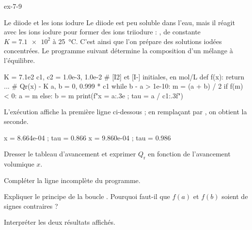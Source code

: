 \begin{blocLivre}{ex-7-9}
\begin{exercice}[2]{Le diiode et les ions iodure}
Le diiode est peu soluble dans l'eau, mais il réagit avec les ions iodure pour former des ions triiodure :
, de constante $K=\num{7.1e2}$ à 25~°C. C'est ainsi que l'on prépare des solutions
iodées concentrées. Le programme suivant détermine la composition d'un mélange à l'équilibre.
\begin{python}
K = 7.1e2
c1, c2 = 1.0e-3, 1.0e-2    # [I2] et [I-] initiales, en mol/L
def f(x):
    return ...             # Qr(x) - K
a, b = 0, 0.999 * c1
while b - a > 1e-10:
    m = (a + b) / 2
    if f(m) < 0:
        a = m
    else:
        b = m
print(f"x = {a:.3e} ; tau = {a / c1:.3f}")
\end{python}
L'exécution affiche la première ligne ci-dessous ; en remplaçant  par , on obtient la seconde.
\begin{console}
x = 8.664e-04 ; tau = 0.866
x = 9.860e-04 ; tau = 0.986
\end{console}
\begin{questions}
\item {}Dresser le tableau d'avancement et exprimer $Q_\mathrm{r}$ en fonction de l'avancement volumique $x$.
\item Compléter la ligne incomplète du programme.
\item Expliquer le principe de la boucle . Pourquoi faut-il que $f(a)$ et $f(b)$ soient de signes contraires ?
\item Interpréter les deux résultats affichés.
\end{questions}
\end{exercice}
\end{blocLivre}
